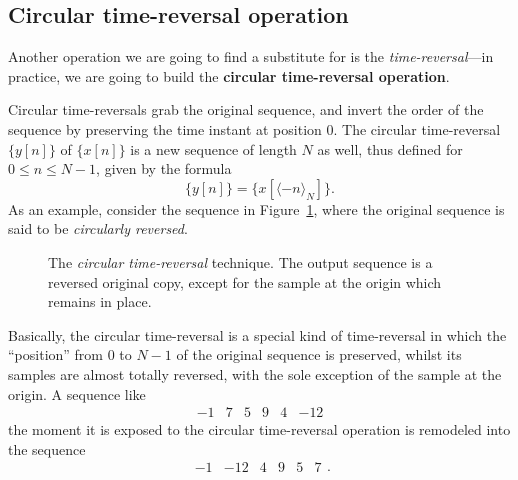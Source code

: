\documentclass[\documentfontsize, twocolumn]{\classname}
\begin{document}
\subsection{Circular time-reversal operation}
Another operation we are going to find a substitute for is the \emph{time-reversal}---in practice, we are going to build the \textbf{circular time-reversal operation}.

Circular time-reversals grab the original sequence, and invert the order of the sequence by preserving the time instant at position $0$. The circular time-reversal $\{y[n]\}$ of $\{x[n]\}$ is a new sequence of length $N$ as well, thus defined for $0 \leq n \leq N-1$, given by the formula
\begin{equation}\label{eqn:circularTimeReversal}
    \{y[n]\} = \{x[\langle -n \rangle_N]\}.
\end{equation}
As an example, consider the sequence in Figure~\ref{tikz:circularTimeReversal}, where the original sequence is said to be \emph{circularly reversed}.
\begin{figure}[ht]
\begin{center}
    \end{center}\caption{The \emph{circular time-reversal} technique. The output sequence is a reversed original copy, except for the sample at the origin which remains in place.}\label{tikz:circularTimeReversal}
\end{figure}

Basically, the circular time-reversal is a special kind of time-reversal in which the ``position'' from $0$ to $N-1$ of the original sequence is preserved, whilst its samples are almost totally reversed, with the sole exception of the sample at the origin. A sequence like 
\[
    \begin{matrix} -1 & 7 & 5 & 9 & 4 & -12\end{matrix}
\]
the moment it is exposed to the circular time-reversal operation is remodeled into the sequence
\[
    \begin{matrix} -1 & -12 & 4 & 9 & 5 & 7\end{matrix}.
\]
\end{document}
